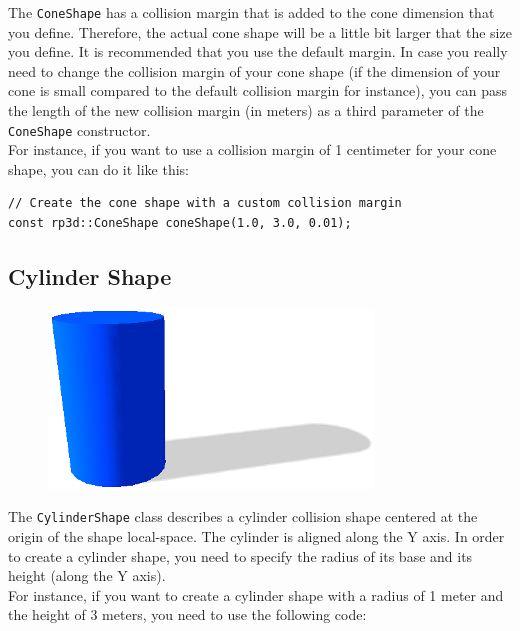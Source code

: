 \documentclass[a4paper,12pt]{article}
\begin{document}
    \vspace{0.6cm}

    The \texttt{ConeShape} has a collision margin that is added to the cone dimension that you define. Therefore, the actual cone shape will be a little bit larger that the size you define.
    It is recommended that you use the default margin. In case you really need to change the collision margin of your cone shape (if the dimension of your cone is small compared
    to the default collision margin for instance), you can pass the length of the new collision margin (in meters) as a third parameter of the \texttt{ConeShape} constructor. \\

    For instance, if you want to use a collision margin of 1 centimeter for your cone shape, you can do it like this: \\

   \begin{lstlisting}
// Create the cone shape with a custom collision margin
const rp3d::ConeShape coneShape(1.0, 3.0, 0.01);
  \end{lstlisting}

    \subsection{Cylinder Shape}

    \begin{figure}[h]
        \centering
        \includegraphics{cylindershape.png}
        \label{fig:cylindershape}
    \end{figure}

    The \texttt{CylinderShape} class describes a cylinder collision shape centered at the origin of the shape local-space. The cylinder is aligned along the Y axis.
    In order to create a cylinder shape, you need to specify the radius of its base and its height (along the Y axis). \\

    For instance, if you want to create a cylinder shape with a radius of 1 meter and the height of 3 meters, you need to use the following code: \\
\end{document}
